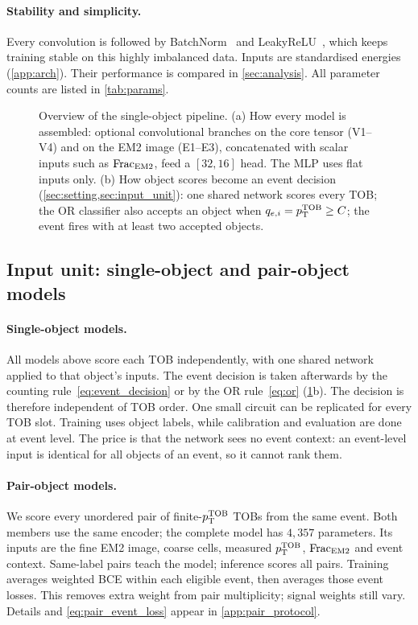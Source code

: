 \paragraph{Stability and simplicity.}
Every convolution is followed by BatchNorm~\cite{ioffe2015batchnorm} and LeakyReLU~\cite{maas2013leaky}, which keeps training stable on this highly imbalanced data. Inputs are standardised energies (\cref{app:arch}). Their performance is compared in \cref{sec:analysis}. All parameter counts are listed in \cref{tab:params}.

\begin{figure}[t]
  \centering
  \resizebox{0.95\linewidth}{!}{}
  \caption{Overview of the single-object pipeline. (a) How every model is assembled: optional convolutional branches on the core tensor (V1--V4) and on the EM2 image (E1--E3), concatenated with scalar inputs such as $\mathrm{Frac}_{\mathrm{EM2}}$, feed a $[32,16]$ head. The MLP uses flat inputs only. (b) How object scores become an event decision (\cref{sec:setting,sec:input_unit}): one shared network scores every TOB; the OR classifier also accepts an object when $q_{e,i}=p_{\mathrm{T}}^{\mathrm{TOB}}\geq C$; the event fires with at least two accepted objects.}
  \label{fig:arch}
\end{figure}

\subsection{Input unit: single-object and pair-object models}
\label{sec:input_unit}
\paragraph{Single-object models.}
All models above score each TOB independently, with one shared network applied to that object's inputs. The event decision is taken afterwards by the counting rule~\eqref{eq:event_decision} or by the OR rule~\eqref{eq:or} (\cref{fig:arch}b). The decision is therefore independent of TOB order. One small circuit can be replicated for every TOB slot. Training uses object labels, while calibration and evaluation are done at event level. The price is that the network sees no event context: an event-level input is identical for all objects of an event, so it cannot rank them.

\paragraph{Pair-object models.}
We score every unordered pair of finite-$p_{\mathrm{T}}^{\mathrm{TOB}}$ TOBs from the same event.
Both members use the same encoder; the complete model has $4{,}357$ parameters.
Its inputs are the
fine EM2 image, coarse cells, measured $p_{\mathrm{T}}^{\mathrm{TOB}}$, $\mathrm{Frac}_{\mathrm{EM2}}$ and event context.
Same-label pairs teach the model; inference scores all pairs. Training averages
weighted BCE within each eligible event, then averages those event losses.
This removes extra weight from pair multiplicity; signal weights still vary.
Details and \eqref{eq:pair_event_loss} appear in \cref{app:pair_protocol}.


